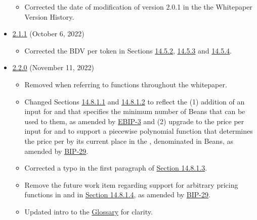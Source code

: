 \documentclass[class=article, crop=false]{standalone}
\begin{document}
\begin{itemize}[topsep=0pt, itemsep=3pt,leftmargin=16pt]
\begin{itemize}
        \item Corrected the date of modification of version 2.0.1 in the the Whitepaper Version History.
    \end{itemize}  
    \newpage
        \item \href{https://github.com/BeanstalkFarms/Beanstalk/blob/master/version-history/beanstalk2_1_1.pdf}{2.1.1} (October 6, 2022)
    \begin{itemize}
        \item Corrected the BDV per token in Sections \hyperlink{subsubsection.14.5.2}{14.5.2}, \hyperlink{subsubsection.14.5.3}{14.5.3} and \hyperlink{subsubsection.14.5.4}{14.5.4}.
    \end{itemize}
        \item \href{https://github.com/BeanstalkFarms/Beanstalk/blob/master/beanstalk.pdf}{2.2.0} (November 11, 2022)
    \begin{itemize}
        \item Removed \code{()} when referring to functions throughout the whitepaper.
        \item Changed Sections \hyperlink{paragraph.14.8.1.1}{14.8.1.1} and \hyperlink{paragraph.14.8.1.2}{14.8.1.2} to reflect the (1) addition of an input for  and  that specifies the minimum number of Beans that can be used to  them, as amended by \href{https://github.com/BeanstalkFarms/Beanstalk-Governance-Proposals/blob/master/bip/ebip/ebip-3-pod-listing-cancellation.md}{EBIP-3} and (2) upgrade to the price per  input for  and  to support a piecewise polynomial function that determines the price per  by its current place in the , denominated in Beans, as amended by \href{https://github.com/BeanstalkFarms/Beanstalk-Governance-Proposals/blob/master/bip/bip-29-pod-market-price-functions.md}{BIP-29}.
        \item Corrected a typo in the first paragraph of \hyperlink{paragraph.14.8.1.3}{Section 14.8.1.3}.
        \item Remove the future work item regarding support for arbitrary pricing functions in  and  in \hyperlink{paragraph.14.8.1.4}{Section 14.8.1.4}, as amended by \href{https://github.com/BeanstalkFarms/Beanstalk-Governance-Proposals/blob/master/bip/bip-29-pod-market-price-functions.md}{BIP-29}.
        \item Updated intro to the \hyperlink{subsection.14.11}{Glossary} for clarity.

\end{itemize}
\end{itemize}
\end{document}
